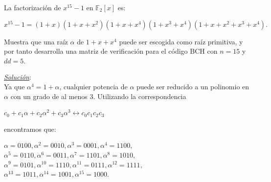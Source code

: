 \begin{frame}  \small  

\begin{ejemplo}

La factorización  de $x^{15} -1$ en $\mathbb{F}_2[x]$ es:

$x^{15} -1=(1+x)(1+x+x^2)(1+x+x^4)(1+x^3 +x^4)(1+x+x^2 +x^3 +x^4).$

Muestra que una raíz $\alpha$ de $1 + x + x^4$ puede ser escogida como raíz primitiva, y por tanto desarrolla una matriz de verificación para el código BCH con $n = 15$ y $dd = 5$.\\
\end{ejemplo}

\end{frame} 

\begin{frame}  \small  

\textit{\underline{Solución}}:\\

Ya que $\alpha^4 = 1 + \alpha$, cualquier potencia de $\alpha$ puede ser reducido a un polinomio en $\alpha$ con un grado de al menos 3. Utilizando la correspondencia 

\begin{center}
$c_0 +c_1\alpha +c_2 \alpha^2 +c_3\alpha^3 \leftrightarrow c_0 c_1 c_2 c_3$
\end{center}

encontramos que:\\


\begin{center}
$\alpha = 0100, \alpha^2 = 0010,	\alpha^3 = 0001, \alpha^4 = 1100,$\\
$\alpha^5 = 0110, \alpha^6 = 0011, \alpha^7 = 1101, \alpha^8 = 1010,$\\
$\alpha^9 = 0101, \alpha^{10} = 1110, \alpha^{11} = 0111, \alpha^{12} = 1111,$\\
$\alpha^{13} = 1011, \alpha^{14} = 1001, \alpha^{15} = 1000.$\\

\end{center}


\end{frame} 

